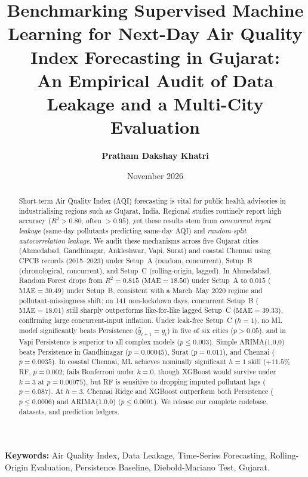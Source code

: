 \documentclass[11pt,a4paper]{article}
\title{%
  \Large\bfseries Benchmarking Supervised Machine Learning for Next-Day Air Quality Index Forecasting in Gujarat: \\
  An Empirical Audit of Data Leakage and a Multi-City Evaluation
}
\author{%
  \textbf{Pratham Dakshay Khatri}
}
\date{November 2026}
\begin{document}
\maketitle

\begin{abstract}
\noindent
Short-term Air Quality Index (AQI) forecasting is vital for public health advisories in industrialising regions such as Gujarat, India. Regional studies routinely report high accuracy ($R^2 > 0.80$, often $> 0.95$), yet these results stem from \emph{concurrent input leakage} (same-day pollutants predicting same-day AQI) and \emph{random-split autocorrelation leakage}. We audit these mechanisms across five Gujarat cities (Ahmedabad, Gandhinagar, Ankleshwar, Vapi, Surat) and coastal Chennai using CPCB records (2015--2023) under Setup~A (random, concurrent), Setup~B (chronological, concurrent), and Setup~C (rolling-origin, lagged). In Ahmedabad, Random Forest drops from $R^2 = \mathbf{0.815}$ ($\text{MAE}=18.50$) under Setup~A to $\mathbf{0.015}$ ($\text{MAE}=30.49$) under Setup~B, consistent with a March--May 2020 regime and pollutant-missingness shift; on 141 non-lockdown days, concurrent Setup~B ($\text{MAE}=18.01$) still sharply outperforms like-for-like lagged Setup~C ($\text{MAE}=39.33$), confirming large concurrent-input inflation. Under leak-free Setup~C ($h=1$), no ML model significantly beats Persistence ($\hat{y}_{t+1}=y_t$) in five of six cities ($p > 0.05$), and in Vapi Persistence is superior to all complex models ($p \le 0.003$). Simple ARIMA(1,0,0) beats Persistence in Gandhinagar ($p=0.00045$), Surat ($p=0.011$), and Chennai ($p=0.0035$). In coastal Chennai, ML achieves nominally significant $h=1$ skill ($+11.5\%$ RF, $p=0.002$; fails Bonferroni under $k=0$, though XGBoost would survive under $k=3$ at $p=0.00075$), but RF is sensitive to dropping imputed pollutant lags ($p=0.087$). At $h=3$, Chennai Ridge and XGBoost outperform both Persistence ($p \le 0.0006$) and ARIMA(1,0,0) ($p \le 0.0001$). We release our complete codebase, datasets, and prediction ledgers.
\end{abstract}

\vspace{0.5em}
\noindent\textbf{Keywords:} Air Quality Index, Data Leakage, Time-Series Forecasting, Rolling-Origin Evaluation, Persistence Baseline, Diebold-Mariano Test, Gujarat.








\end{document}
